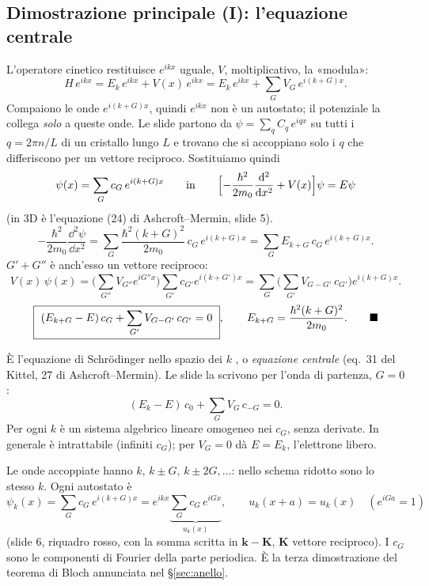 \documentclass[11pt,a4paper]{article}
\begin{document}
\subsection{Dimostrazione principale (I): l'equazione centrale}\label{sec:centrale}
\begin{dimostrazione}
L'operatore cinetico restituisce $e^{ikx}$ uguale, $V$, moltiplicativo, la «modula»:
\[
H\,e^{ikx}=E_k\,e^{ikx}+V(x)\,e^{ikx}=E_k\,e^{ikx}+\sum_GV_G\,e^{i(k+G)x}.
\]
Compaiono le onde $e^{i(k+G)x}$, quindi $e^{ikx}$ non è un autostato; il potenziale la collega \emph{solo} a queste onde.
Le slide partono da $\psi=\sum_qC_q\,e^{iqx}$ su tutti i $q=2\pi n/L$ di un cristallo lungo $L$ e trovano che si accoppiano solo i $q$ che differiscono per un
vettore reciproco. Sostituiamo quindi
\[
\psi(x)=\sum_Gc_G\,e^{i(k+G)x}\qquad\text{in}\qquad\Bigl[-\frac{\hbar^2}{2m_0}\frac{\mathrm d^2}{\mathrm d x^2}+V(x)\Bigr]\psi=E\psi
\]
(in 3D è l'equazione (24) di Ashcroft--Mermin, slide 5).
\[
-\frac{\hbar^2}{2m_0}\frac{\dd^2\psi}{\dd x^2}=\sum_G\frac{\hbar^2(k+G)^2}{2m_0}\,c_G\,e^{i(k+G)x}=\sum_GE_{k+G}\,c_G\,e^{i(k+G)x}.
\]
$G'+G''$ è anch'esso un vettore reciproco:
\[
V(x)\,\psi(x)=\Big(\sum_{G''}V_{G''}e^{iG''x}\Big)\sum_{G'}c_{G'}e^{i(k+G')x}=\sum_G\Big(\sum_{G'}V_{G-G'}\,c_{G'}\Big)e^{i(k+G)x}.
\]
\begin{equation}\label{eq:centrale}
\boxed{\ (E_{k+G}-E)\,c_G+\sum_{G'}V_{G-G'}\,c_{G'}=0\ },\qquad E_{k+G}=\frac{\hbar^2(k+G)^2}{2m_0}.\qed
\end{equation}
\end{dimostrazione}
È l'equazione di Schrödinger nello spazio dei $k$ , o \emph{equazione centrale}  (eq.~31 del Kittel, 27 di
Ashcroft--Mermin). Le slide la scrivono per l'onda di partenza, $G=0$:
\[
(E_k-E)\,c_0+\sum_GV_G\,c_{-G}=0 .
\]
Per ogni $k$ è un sistema algebrico lineare omogeneo nei $c_G$, senza derivate. In generale è intrattabile (infiniti $c_G$); per $V_G=0$ dà $E=E_k$, l'elettrone libero.

\begin{risultato}
Le onde accoppiate hanno $k,\,k\pm G,\,k\pm2G,\dots$: nello schema ridotto sono lo stesso $k$. Ogni autostato è
\[
\psi_k(x)=\sum_Gc_G\,e^{i(k+G)x}=e^{ikx}\underbrace{\sum_Gc_G\,e^{iGx}}_{u_k(x)},\qquad u_k(x+a)=u_k(x)\quad(e^{iGa}=1)
\]
(slide 6, riquadro rosso, con la somma scritta in $\mathbf k-\mathbf K$, $\mathbf K$ vettore reciproco). I $c_G$ sono le componenti di Fourier della parte periodica.
È la terza dimostrazione del teorema di Bloch annunciata nel §\ref{sec:anello}.
\end{risultato}
\end{document}
